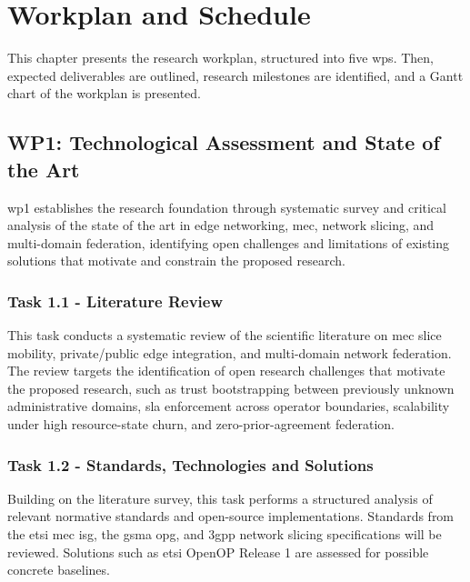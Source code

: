 \chapter{Workplan and Schedule}
\label{chap:workplan-schedule}

\begin{introduction}
This chapter presents the research workplan, structured into five \acp{wp}. Then, expected deliverables are outlined, research milestones are identified, and a Gantt chart of the workplan is presented. 
\end{introduction}

\section{WP1: Technological Assessment and State of the Art}

\ac{wp}1 establishes the research foundation through systematic survey and critical analysis of the state of the art in edge networking, \ac{mec}, network slicing, and multi-domain federation, identifying open challenges and limitations of existing solutions that motivate and constrain the proposed research.

\subsection{Task 1.1 - Literature Review}

This task conducts a systematic review of the scientific literature on \ac{mec} slice mobility, private/public edge integration, and multi-domain network federation. The review targets the identification of open research challenges that motivate the proposed research, such as trust bootstrapping between previously unknown administrative domains, \ac{sla} enforcement across operator boundaries, scalability under high resource-state churn, and zero-prior-agreement federation.

\subsection{Task 1.2 - Standards, Technologies and Solutions}

Building on the literature survey, this task performs a structured analysis of relevant normative standards and open-source implementations. Standards from the \ac{etsi} \ac{mec} \ac{isg}, the \ac{gsma} \ac{opg}, and \ac{3gpp} network slicing specifications will be reviewed. Solutions such as \ac{etsi} OpenOP Release 1 are assessed for possible concrete baselines.

